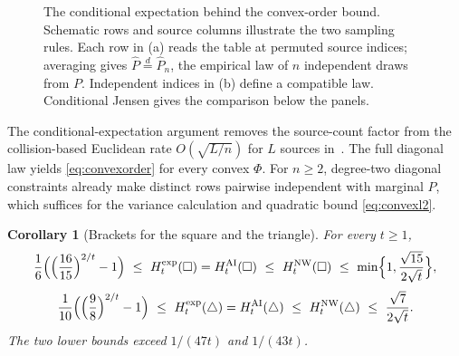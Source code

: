 \documentclass[11pt]{article}
\theoremstyle{plain}
\newtheorem{corollary}[theorem]{Corollary}
\theoremstyle{definition}
\begin{document}
\begin{figure}[!htbp]
\centering
{}
\caption{The conditional expectation behind the convex-order bound. Schematic rows and source columns illustrate the two sampling rules. Each row in (a) reads the table at permuted source indices; averaging gives $\widehat P\overset d=\widehat P_n$, the empirical law of $n$ independent draws from $P$. Independent indices in (b) define a compatible law. Conditional Jensen gives the comparison below the panels.}\label{fig:convex-order}
\end{figure}


The conditional-expectation argument removes the source-count factor from the collision-based Euclidean rate $O(\sqrt{L/n})$ for $L$ sources in~\cite[eqs.~(37) and (A7)]{NW2020}. The full diagonal law yields \eqref{eq:convexorder} for every convex $\Phi$. For $n\ge2$, degree-two diagonal constraints already make distinct rows pairwise independent with marginal $P$, which suffices for the variance calculation and quadratic bound \eqref{eq:convexl2}.

\FloatBarrier
\begin{corollary}[Brackets for the square and the triangle]\label{cor:brackets}\label{thm:brackets-intro}
For every $t\ge1$,
\[
\frac16\Bigl(\Bigl(\frac{16}{15}\Bigr)^{2/t}-1\Bigr)\ \le\ H^{\mathrm{exp}}_t(\square)=H^{\mathrm{AI}}_t(\square)\ \le\ H^{\mathrm{NW}}_t(\square)\ \le\ \min\Bigl\{1,\frac{\sqrt{15}}{2\sqrt t}\Bigr\},
\]
\[
\frac1{10}\Bigl(\Bigl(\frac98\Bigr)^{2/t}-1\Bigr)\ \le\ H^{\mathrm{exp}}_t(\triangle)=H^{\mathrm{AI}}_t(\triangle)\ \le\ H^{\mathrm{NW}}_t(\triangle)\ \le\ \frac{\sqrt7}{2\sqrt t}.
\]
The two lower bounds exceed $1/(47t)$ and $1/(43t)$.
\end{corollary}
\end{document}
